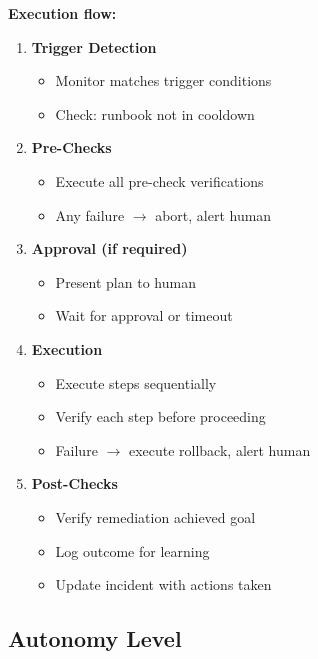 \textbf{Execution flow:}

\begin{enumerate}
    \item \textbf{Trigger Detection}
    \begin{itemize}
        \item Monitor matches trigger conditions
        \item Check: runbook not in cooldown
    \end{itemize}

    \item \textbf{Pre-Checks}
    \begin{itemize}
        \item Execute all pre-check verifications
        \item Any failure $\rightarrow$ abort, alert human
    \end{itemize}

    \item \textbf{Approval (if required)}
    \begin{itemize}
        \item Present plan to human
        \item Wait for approval or timeout
    \end{itemize}

    \item \textbf{Execution}
    \begin{itemize}
        \item Execute steps sequentially
        \item Verify each step before proceeding
        \item Failure $\rightarrow$ execute rollback, alert human
    \end{itemize}

    \item \textbf{Post-Checks}
    \begin{itemize}
        \item Verify remediation achieved goal
        \item Log outcome for learning
        \item Update incident with actions taken
    \end{itemize}
\end{enumerate}

\subsection{Autonomy Level}

